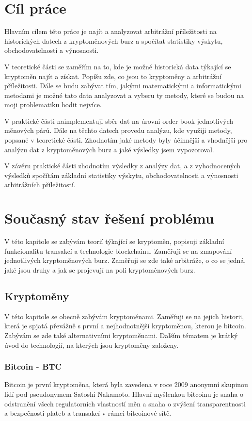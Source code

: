 \documentclass[thesis=B,czech]{FITthesis}[2019/03/21]
\begin{document}
\chapter{Cíl práce}
Hlavním cílem této práce je najít a analyzovat arbitrážní příležitosti na historických datech z kryptoměnových burz a spočítat statistiky výskytu, obchodovatelnosti a výnosnosti. 

V teoretické části se zaměřím na to, kde je možné historická data týkající se kryptoměn najít a získat. Popíšu zde, co jsou to kryptoměny a arbitrážní příležitosti. Dále se budu zabývat tím, jakými matematickými a informatickými metodami je možné tato data analyzovat a vyberu ty metody, které se budou na moji problematiku hodit nejvíce.

V praktické části naimplementuji sběr dat na úrovni order book jednotlivých měnových párů. Dále na těchto datech provedu analýzu, kde využiji metody, popsané v teoretické části. Zhodnotím jaké metody byly účinnější a vhodnější pro analýzu dat z kryptoměnových burz a jaké výsledky jsem vypozoroval.

V závěru praktické části zhodnotím výsledky z analýzy dat, a z vyhodnocených výsledků spočítám základní statistiky výskytu, obchodovatelnosti a výnosnosti arbitrážních příležitostí. 

\chapter{Současný stav řešení problému}
V této kapitole se zabývám teorií týkající se kryptoměn, popisuji základní funkcionalitu transakcí a technologie blockchainu. Zaměřuji se na zmapování jednotlivých kryptoměnových burz. Zaměřuji se zde také arbitráže, o co se jedná, jaké jsou druhy a jak se projevují na poli kryptoměnových burz.

\section{Kryptoměny}
V této kapitole se obecně zabývám kryptoměnami. Zaměřuji se na jejich historii, která je spjatá převážně s první a nejhodnotnější kryptoměnou, kterou je bitcoin. Zabývám se zde také alternativními kryptoměnami. Dalším tématem je krátký úvod do technologií, na kterých jsou kryptoměny založeny. \cite{BudoucnostFinTrhu}

\subsection{Bitcoin - BTC}
Bitcoin je první kryptoměna, která byla zavedena v roce 2009 anonymní skupinou lidí pod pseudonymem Satoshi Nakamoto. Hlavní myšlenkou bitcoinu je snaha o odstranění všech regulatorních vlastností měn a snaha o zvýšení transparentnosti a bezpečnosti plateb a transakcí v rámci bitcoinové sítě. \cite{Finex}
\end{document}
